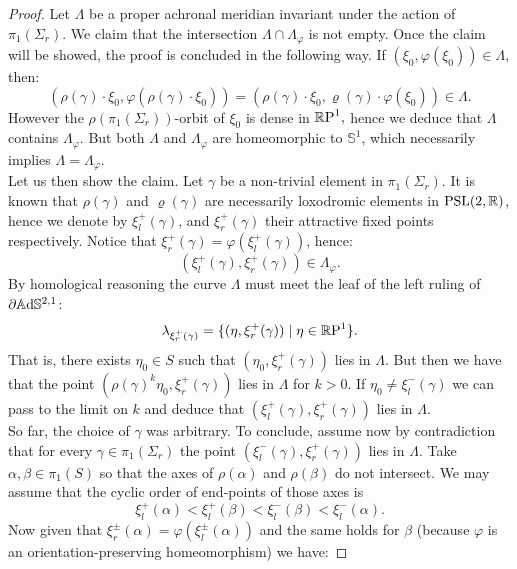 \begin{proof}
    Let $\Lambda$ be a proper achronal meridian invariant under the action of $\pi_1(\Sigma_r)$. We claim that the intersection $\Lambda\cap \Lambda_\varphi$ is not empty. Once the claim will be showed, the proof is concluded in the following way. If $(\xi_0 , \varphi(\xi_0))\in\Lambda,$ then: 
    \[
        (\rho(\gamma)\cdot\xi_0,\varphi(\rho(\gamma)\cdot\xi_0))=(\rho(\gamma)\cdot\xi_0,\varrho(\gamma)\cdot\varphi(\xi_0))\in\Lambda.
    \] 
    However the $\rho(\pi_1(\Sigma_r))$-orbit of $\xi_0$ is dense in $\S,$ hence we deduce that $\Lambda$ contains $\Lambda_\varphi$. But both $\Lambda$ and $\Lambda_\varphi$ are homeomorphic to $\mathbb{S}^1$, which necessarily implies $\Lambda=\Lambda_\varphi.$\\
    Let us then show the claim. Let $\gamma$ be a non-trivial element in $\pi_1(\Sigma_r)$. It is known that $\rho(\gamma)$ and $\varrho(\gamma)$ are necessarily loxodromic elements in $\PSL$, hence we denote by $\xi_l^+(\gamma)$, and $\xi_r^+(\gamma)$ their attractive fixed points respectively. Notice that $\xi_r^+(\gamma)=\varphi(\xi_l^+(\gamma))$, hence: 
    \[
        (\xi_l^+(\gamma),\xi_r^+(\gamma))\in \Lambda_\varphi.
    \]
    By homological reasoning the curve $\Lambda$ must meet the leaf of the left ruling of $\partial\A^{2,1}$: 
    \[
        \lambda_{\xi_r^+(\gamma)}=\{(\eta,\xi_r^+(\gamma))\;|\;\eta\in\S\}.
    \]
    That is, there exists $\eta_0\in S$ such that $(\eta_0,\xi_r^+(\gamma))$ lies in $\Lambda$. But then we have that the point $(\rho(\gamma)^k\eta_0,\xi_r^+(\gamma))$ lies in $\Lambda$ for $k>0$. If $\eta_0\neq \xi_l^-(\gamma)$ we can pass to the limit on $k$ and deduce that $(\xi_l^+(\gamma),\xi_r^+(\gamma))$ lies in $\Lambda.$ \\
    So far, the choice of $\gamma$ was arbitrary. To conclude, assume now by contradiction that for every $\gamma\in\pi_1(\Sigma_r)$ the point $(\xi_l^-(\gamma),\xi_r^+(\gamma))$ lies in $\Lambda$. Take $\alpha,\beta\in\pi_1(S)$ so that the axes of $\rho(\alpha)$ and $\rho(\beta)$ do not intersect. We may assume that the cyclic order of end-points of those axes is 
    \begin{equation}\label{57}
        \xi_l^+(\alpha)<\xi_l^+(\beta)<\xi_l^-(\beta)<\xi_l^-(\alpha).
    \end{equation}
    Now given that $\xi_r^\pm(\alpha)=\varphi(\xi_l^\pm(\alpha))$ and the same holds for $\beta$ (because $\varphi$ is an orientation-preserving homeomorphism) we have: 


\end{proof}
